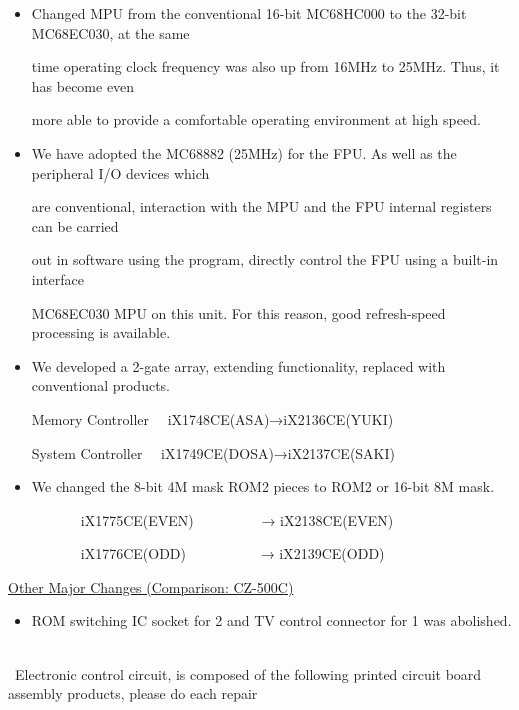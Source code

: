 \documentclass[twoside,a4paper,12pt]{article}
\begin{document}
\renewcommand{\labelitemi}{\scriptsize●}
\small
\begin{itemize}[leftmargin=25mm, itemsep=-1mm, topsep=1mm]
\item
Changed MPU from the conventional 16-bit MC68HC000 to the 32-bit MC68EC030, at the same

time operating clock frequency was also up from 16MHz to 25MHz. Thus, it has become even

more able to provide a comfortable operating environment at high speed.
\item
We have adopted the MC68882 (25MHz) for the FPU. As well as the peripheral I/O devices which

are conventional, interaction with the MPU and the FPU internal registers can be carried

out in software using the program, directly control the FPU using a built-in interface

MC68EC030 MPU on this unit. For this reason, good refresh-speed processing is available.
\item
We developed a 2-gate array, extending functionality, replaced with conventional products.

Memory Controller \ \ iX1748CE(ASA)→iX2136CE(YUKI)

System Controller \ \ iX1749CE(DOSA)→iX2137CE(SAKI)
\item
We changed the 8-bit 4M mask ROM2 pieces to ROM2 or 16-bit 8M mask.

\ \ \ \ \ \ \ iX1775CE(EVEN) \ \ \ \ \ \ \ \ \ → iX2138CE(EVEN)

\ \ \ \ \ \ \ iX1776CE(ODD) \ \ \ \ \ \ \ \ \ \ → iX2139CE(ODD)
\end{itemize}

\uline{Other Major Changes (Comparison: CZ-500C)}

\begin{itemize}[leftmargin=25mm, itemsep=-1mm, topsep=1mm]
\item
ROM switching IC socket for 2 and TV control connector for 1 was abolished.\\
\end{itemize}

\ \\[-3mm]

\scriptsize \ Electronic control circuit, is composed of the following printed circuit board assembly products, please do each repair
\end{document}

